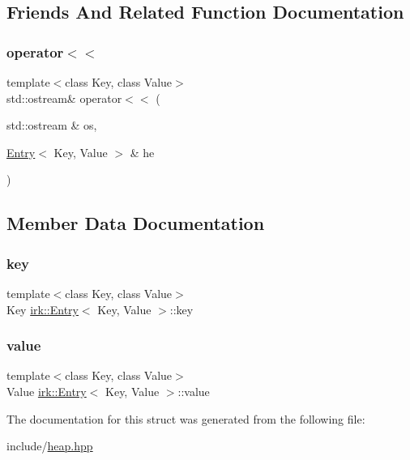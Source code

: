 \subsection{Friends And Related Function Documentation}
\mbox{\label{structirk_1_1Entry_a885f1645de32df3dbfbf9f2f47f7ea1f}} 
\subsubsection{\texorpdfstring{operator$<$$<$}{operator<<}}
{\footnotesize\ttfamily template$<$class Key, class Value$>$ \\
std\+::ostream\& operator$<$$<$ (\begin{DoxyParamCaption}\item[{std\+::ostream \&}]{os,  }\item[{\mbox{\hyperlink{structirk_1_1Entry}{Entry}}$<$ Key, Value $>$ \&}]{he }\end{DoxyParamCaption})\hspace{0.3cm}{\ttfamily [friend]}}



\subsection{Member Data Documentation}
\mbox{\label{structirk_1_1Entry_a49866a2c0c5ee90f6a8a548c9b9e3d14}} 
\subsubsection{\texorpdfstring{key}{key}}
{\footnotesize\ttfamily template$<$class Key, class Value$>$ \\
Key \mbox{\hyperlink{structirk_1_1Entry}{irk\+::\+Entry}}$<$ Key, Value $>$\+::key}

\mbox{\label{structirk_1_1Entry_a880c6961b017dc4bfc6ff5e635664aab}} 
\subsubsection{\texorpdfstring{value}{value}}
{\footnotesize\ttfamily template$<$class Key, class Value$>$ \\
Value \mbox{\hyperlink{structirk_1_1Entry}{irk\+::\+Entry}}$<$ Key, Value $>$\+::value}



The documentation for this struct was generated from the following file\+:\begin{DoxyCompactItemize}
\item 
include/\mbox{\hyperlink{heap_8hpp}{heap.\+hpp}}\end{DoxyCompactItemize}
